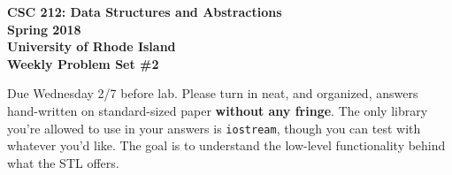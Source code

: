 \documentclass[11pt]{article}
\begin{document}
\thispagestyle{empty}

\begin{center}
    {\Large\bf CSC 212: Data Structures and Abstractions}\\
    \medskip
    {\Large\bf Spring 2018}\\
    \medskip
    {\Large\bf University of Rhode Island}\\
    \bigskip
    {\Large\bf Weekly Problem Set \#2}
\end{center}

Due Wednesday 2/7 before lab. Please turn in neat, and organized, answers hand-written on standard-sized paper \textbf{without any fringe}. 
The only library you're allowed to use in your answers is \verb|iostream|, though you can test with whatever you'd like. The goal is to understand the low-level functionality behind what the STL offers.
\end{document}
